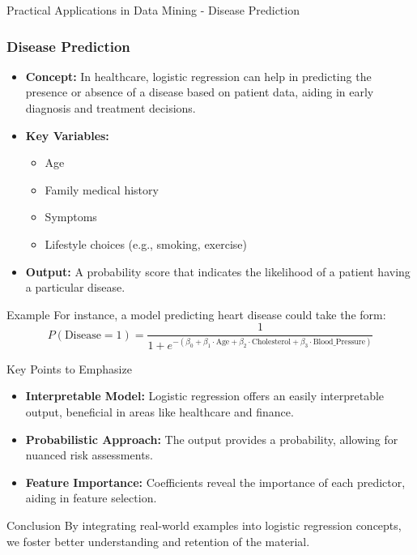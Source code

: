 \documentclass[aspectratio=169]{beamer}
\begin{document}
\begin{frame}[fragile]{Practical Applications in Data Mining - Disease Prediction}
    \frametitle{Disease Prediction}

    \begin{itemize}
        \item \textbf{Concept:} In healthcare, logistic regression can help in predicting the presence or absence of a disease based on patient data, aiding in early diagnosis and treatment decisions.
        \item \textbf{Key Variables:}
        \begin{itemize}
            \item Age
            \item Family medical history
            \item Symptoms
            \item Lifestyle choices (e.g., smoking, exercise)
        \end{itemize}
        \item \textbf{Output:} A probability score that indicates the likelihood of a patient having a particular disease.
    \end{itemize}
    
    \begin{block}{Example}
        For instance, a model predicting heart disease could take the form:
        \begin{equation}
        P(\text{Disease} = 1) = \frac{1}{1 + e^{-(\beta_0 + \beta_1 \cdot \text{Age} + \beta_2 \cdot \text{Cholesterol} + \beta_3 \cdot \text{Blood\_Pressure})}}
        \end{equation}
    \end{block}
\end{frame}

\begin{frame}[fragile]{Key Points to Emphasize}
    \begin{itemize}
        \item \textbf{Interpretable Model:} Logistic regression offers an easily interpretable output, beneficial in areas like healthcare and finance.
        \item \textbf{Probabilistic Approach:} The output provides a probability, allowing for nuanced risk assessments.
        \item \textbf{Feature Importance:} Coefficients reveal the importance of each predictor, aiding in feature selection.
    \end{itemize}
    
    \begin{block}{Conclusion}
        By integrating real-world examples into logistic regression concepts, we foster better understanding and retention of the material.
    \end{block}
\end{frame}
\end{document}
